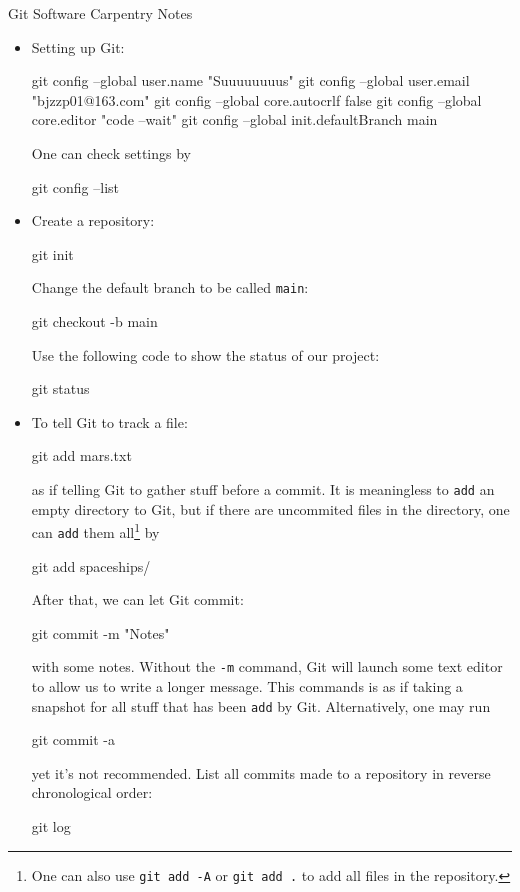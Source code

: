 \documentclass[UTF8]{book}
\date{}
\newcommand{\code}[1]{\colorbox{codegray}{\texttt{#1}}}
\begin{document}
\kaishu
\begin{center}
\Large{Git Software Carpentry Notes}
\end{center}
\begin{itemize}
\item Setting up Git:
\begin{bash}
git config --global user.name "Suuuuuuuus"
git config --global user.email "bjzzp01@163.com"
git config --global core.autocrlf false
git config --global core.editor "code --wait"
git config --global init.defaultBranch main
\end{bash}
One can check settings by
\begin{bash}
git config --list
\end{bash}
\item Create a repository:
\begin{bash}
git init
\end{bash}
Change the default branch to be called \code{main}:
\begin{bash}
git checkout -b main
\end{bash}
Use the following code to show the status of our project:
\begin{bash}
git status
\end{bash}
\item To tell Git to track a file:
\begin{bash}
git add mars.txt
\end{bash}
as if telling Git to gather stuff before a commit. It is meaningless to \code{add} an empty directory to Git, but if there are uncommited files in the directory, one can \code{add} them all\footnote{One can also use \code{git add -A} or \code{git add .} to add all files in the repository.} by
\begin{bash}
git add spaceships/
\end{bash}
After that, we can let Git commit:
\begin{bash}
git commit -m "Notes"
\end{bash}
with some notes. Without the \code{-m} command, Git will launch some text editor to allow us to write a longer message. This commands is as if taking a snapshot for all stuff that has been \code{add} by Git. Alternatively, one may run
\begin{bash}
git commit -a
\end{bash}
yet it's not recommended. List all commits made to a repository in reverse chronological order:
\begin{bash}
git log
\end{bash}

\end{itemize}
\end{document}

